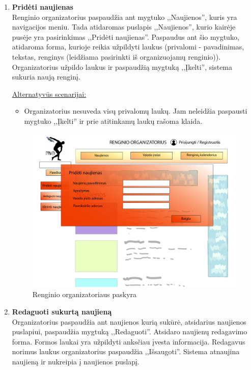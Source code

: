 \documentclass{VUMIFPSkursinis}
\begin{document}
\begin{enumerate} [label = \textbf{U\arabic*.}]
			\item \textbf{Pridėti naujienas}   \\
					Renginio organizatorius paspaudžia ant mygtuko ,,Naujienos'', kuris yra navigacijos meniu. Tada atidaromas puslapis ,,Naujienos'', kurio kairėje pusėje yra pasirinkimas ,,Pridėti naujienas''. Paspaudus ant šio mygtuko, atidaroma forma, kurioje reikia užpildyti laukus (privalomi - pavadinimas, tekstas, renginys (leidžiama pasirinkti iš organizuojamų renginio)). Organizatorius užpildo laukus ir paspaudžią mygtuką ,,Įkelti'', sistema sukuria naują renginį.
					
					\underline{Alternatyvūs scenarijai:}
					\begin{itemize}
						\item Organizatorius nesuveda visų privalomų laukų. Jam neleidžia paspausti mygtuko ,,Įkelti'' ir prie atitinkamų laukų rašoma klaida.
					\end{itemize}
				
				\begin{figure}[H]
					\centering
					\includegraphics[width=\textwidth, height=8cm, keepaspectratio]{img/PSI4/OrganizatoriusNaujienos-01.jpg}
					\caption{Renginio organizatoriaus paskyra}
					\label{fig:uzd_org_pridetiNaujienas}
				\end{figure}
				
			\item \textbf{Redaguoti sukurtą naujieną}   \\
					Organizatorius paspaudžia ant naujienos kurią sukūrė, atsidarius naujienos puslapiui, paspaudžia mygtuką ,,Redaguoti''. Atsidaro naujienų redagavimo forma. Formos laukai yra užpildyti anksčiau įvesta informacija. Redagavus norimus laukus organizatorius paspaudžia ,,Išsaugoti''. Sistema atnaujina naujieną ir nukreipia į naujienos puslapį. 
					

\end{enumerate}
\end{document}
